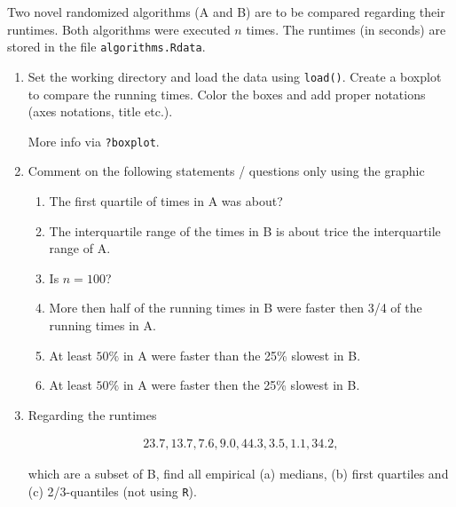 
\begin{exercise}

Two novel randomized algorithms (A and B) are to be compared regarding
their runtimes. Both algorithms were executed $n$ times.
The runtimes (in seconds) are stored in the file \texttt{algorithms.Rdata}.

\begin{enumerate}[label = (\alph*)]
    \item Set the working directory and load the data using \texttt{load()}.
    Create a boxplot to compare the running times. Color the boxes and
    add proper notations (axes notations, title etc.).

    More info via \texttt{?boxplot}.

    \item Comment on the following statements / questions only using the
    graphic

    \begin{enumerate}[label = (\alph*)]
        \item The first quartile of times in A was about?
        \item The interquartile range of the times in B is about trice the interquartile range of A.
        \item Is $n = 100$?
        \item More then half of the running times in B were faster then 3/4 of the running times in A.
        \item At least $50\%$ in A were faster than the 25\% slowest in B.
        \item At least $50\%$ in A were faster then the 25\% slowest in B.
    \end{enumerate}

    \item Regarding the runtimes
    
    \begin{align*}
        23.7, 13.7, 7.6, 9.0, 44.3, 3.5, 1.1, 34.2,
    \end{align*}

    which are a subset of B, find all empirical (a) medians, (b)
    first quartiles and (c) 2/3-quantiles (not using \texttt{R}).
\end{enumerate}

\end{exercise}


\begin{solution}

\phantom{}

\end{solution}

